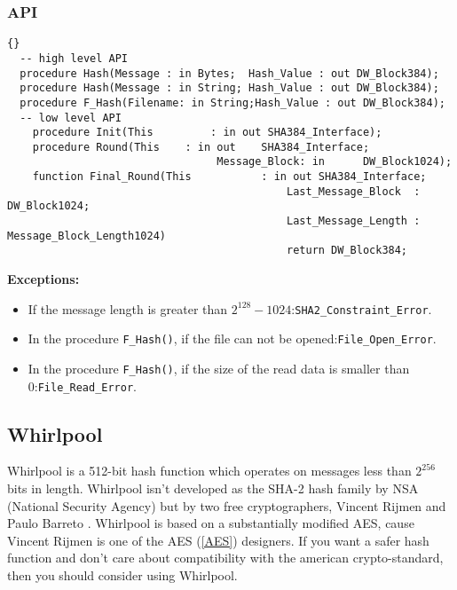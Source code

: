 \subsubsection*{API}
\begin{lstlisting}{}
  -- high level API
  procedure Hash(Message : in Bytes;  Hash_Value : out DW_Block384);
  procedure Hash(Message : in String; Hash_Value : out DW_Block384);
  procedure F_Hash(Filename: in String;Hash_Value : out DW_Block384);
  -- low level API
	procedure Init(This 		: in out SHA384_Interface);
	procedure Round(This 	: in out 	SHA384_Interface;
								 Message_Block: in 		DW_Block1024);
	function Final_Round(This 		    : in out SHA384_Interface;
											Last_Message_Block  : DW_Block1024;
											Last_Message_Length : Message_Block_Length1024)
											return DW_Block384;

\end{lstlisting}
\textbf{Exceptions:}
\begin{itemize}
\item If the message length is greater than
  $2^{128}-1024$:\quad\texttt{SHA2\_Constraint\_Error}.
\item In the procedure \texttt{F\_Hash()}, if the file can not be
  opened:\quad\texttt{File\_Open\_Error}.
\item In the procedure \texttt{F\_Hash()}, if the size of the read
  data is smaller than 0:\quad\texttt{File\_Read\_Error}.
\end{itemize}


\subsection{Whirlpool}
Whirlpool is a 512-bit hash function which operates on messages less
than $2^{256}$ bits in length. Whirlpool isn't developed as the SHA-2
hash family by NSA (National Security Agency) but by two free
cryptographers, Vincent Rijmen and Paulo Barreto
\cite{Whirlpool}. Whirlpool is based on a substantially modified AES,
cause Vincent Rijmen is one of the AES (\ref{AES}) designers. If you
want a safer hash function and don't care about compatibility with the
american crypto-standard, then you should consider using Whirlpool.
